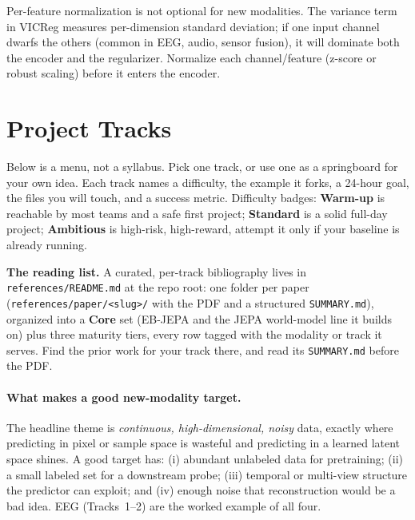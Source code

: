 \documentclass{article}
\newcommand{\code}[1]{\texttt{\small #1}}
\newcommand{\diffeasy}{\colorbox{ebgreen!18}{\textcolor{ebgreen}{\small\bfseries Warm-up}}}
\newcommand{\diffmed}{\colorbox{ebamber!18}{\textcolor{ebamber}{\small\bfseries Standard}}}
\newcommand{\diffhard}{\colorbox{ebred!15}{\textcolor{ebred}{\small\bfseries Ambitious}}}
\begin{document}
\begin{gotchabox}
Per-feature normalization is not optional for new modalities. The variance term in
VICReg measures per-dimension standard deviation; if one input channel dwarfs the
others (common in EEG, audio, sensor fusion), it will dominate both the encoder and
the regularizer. Normalize each channel/feature (z-score or robust scaling) before
it enters the encoder.
\end{gotchabox}
\section{Project Tracks}
\label{sec:tracks}

Below is a menu, not a syllabus. Pick one track, or use one as a springboard for
your own idea. Each track names a difficulty, the example it forks, a 24-hour
goal, the files you will touch, and a success metric. Difficulty badges:
\diffeasy{} is reachable by most teams and a safe first project; \diffmed{} is a
solid full-day project; \diffhard{} is high-risk, high-reward, attempt it only if
your baseline is already running.

\begin{notebox}
\textbf{The reading list.} A curated, per-track bibliography lives in
\code{references/README.md} at the repo root: one folder per paper
(\code{references/paper/<slug>/} with the PDF and a structured \code{SUMMARY.md}),
organized into a \textbf{Core} set (EB-JEPA and the JEPA world-model line it builds
on) plus three maturity tiers, every row tagged with the modality or track it
serves. Find the prior work for your track there, and read its \code{SUMMARY.md}
before the PDF.
\end{notebox}

\paragraph{What makes a good new-modality target.} The headline theme is
\emph{continuous, high-dimensional, noisy} data, exactly where predicting in pixel
or sample space is wasteful and predicting in a learned latent space shines. A
good target has: (i) abundant unlabeled data for pretraining; (ii) a small labeled
set for a downstream probe; (iii) temporal or multi-view structure the predictor
can exploit; and (iv) enough noise that reconstruction would be a bad idea. EEG
(Tracks~1--2) are the worked example of all four.

\end{document}
